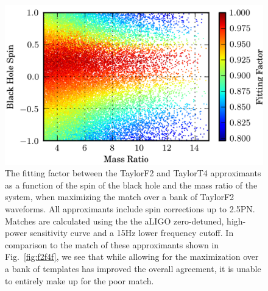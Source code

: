 \begin{figure}
\begin{center}
\includegraphics[width=1.0	\textwidth]{papers/nsbh_faithfulness/figure13.png}
\end{center}
\caption{\label{fig:spin2q}The fitting factor between the TaylorF2 and
TaylorT4 approximants as a function of the spin of the black hole
and the mass ratio of the system, when maximizing the match over a bank of
TaylorF2 waveforms. All approximants include spin corrections up to 2.5\ac{PN}.
Matches are calculated using the the aLIGO
zero-detuned, high-power sensitivity curve and a 15Hz lower frequency cutoff. In 
comparison to the match of these approximants shown in Fig.~\ref{fig:f2f4f}, we see that
while allowing for the maximization over a bank of templates has improved the overall agreement, 
it is unable to entirely make up for the poor match. 
}
\end{figure}

